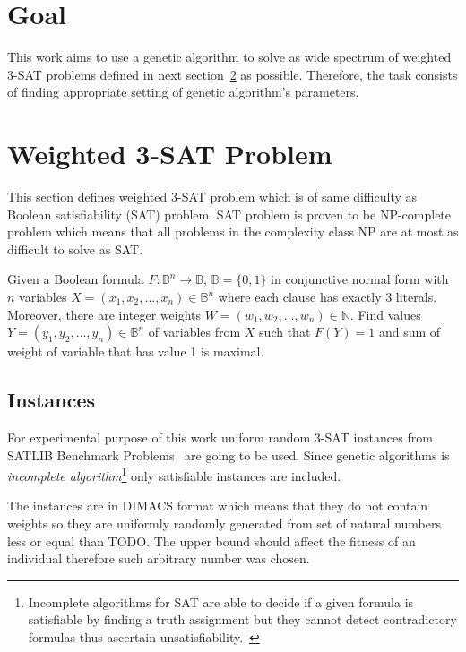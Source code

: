 \documentclass{article}
\begin{document}
\section{Goal}

This work aims to use a genetic algorithm to solve as wide spectrum of
weighted 3-SAT problems defined in next section~\ref{problem} as possible.
Therefore, the task consists of finding appropriate setting of genetic
algorithm's parameters.

\section{Weighted 3-SAT Problem}
\label{problem}

This section defines weighted 3-SAT problem which is of same difficulty
as Boolean satisfiability (SAT) problem.
SAT problem is proven to be NP-complete problem
which means that all problems in the complexity class NP are at most
as difficult to solve as SAT.~\cite{cook1971}

Given a Boolean formula $F: \mathbb{B}^n \to \mathbb{B}$,
$\mathbb{B} = \{0, 1\}$ in conjunctive normal form with $n$ variables
$X = (x_1, x_2, \dots, x_n) \in \mathbb{B}^n$
where each clause has exactly 3 literals.
Moreover, there are integer weights
$W = (w_1, w_2, \dots, w_n) \in \mathbb{N}$.
Find values $Y = (y_1, y_2, \dots, y_n) \in \mathbb{B}^n$ of variables from $X$
such that $F(Y) = 1$
and sum of weight of variable that has value 1 is maximal.

\subsection{Instances}

For experimental purpose of this work uniform random 3-SAT instances
from SATLIB Benchmark Problems~\cite{hoos2000} are going to be used.
Since genetic algorithms is \textit{incomplete algorithm}\footnote{Incomplete
algorithms for SAT are able to decide if a given formula is satisfiable by
finding a truth assignment
but they cannot detect contradictory formulas
thus ascertain unsatisfiability.~\cite{ellerweg2004}}
only satisfiable instances are included.

The instances are in DIMACS format
which means that they do not contain weights so they are uniformly randomly
generated from set of natural numbers less or equal than TODO.
The upper bound should affect the fitness of an individual
therefore such arbitrary number was chosen.
\end{document}
